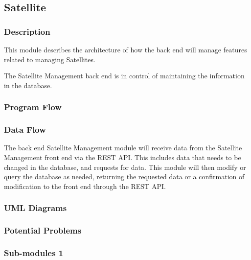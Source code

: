 
\subsection{Satellite}

\subsubsection{Description}

This module describes the architecture of how the back end will manage features related to managing Satellites.

The Satellite Management back end is in control of maintaining the information in the database. 


\subsubsection{Program Flow}


\subsubsection{Data Flow}
The back end Satellite Management module will receive data from the Satellite Management front end via the REST API. 
This includes data that needs to be changed in the database, and requests for data. 
This module will then modify or query the database as needed, 
returning the requested data or a confirmation of modification to the front end through the REST API. 


\subsubsection{UML Diagrams}


\subsubsection{Potential Problems}


\subsubsection{Sub-modules 1}

